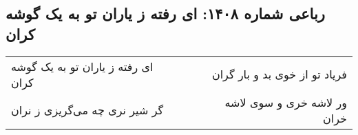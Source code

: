 \begin{center}
\section*{رباعی شماره ۱۴۰۸: ای رفته ز یاران تو به یک گوشه کران}
\label{sec:1408}
\begin{longtable}{l p{0.5cm} r}
ای رفته ز یاران تو به یک گوشه کران
&&
فریاد تو از خوی بد و بار گران
\\
گر شیر نری چه می‌گریزی ز نران
&&
ور لاشه خری و سوی لاشه خران
\\
\end{longtable}
\end{center}
